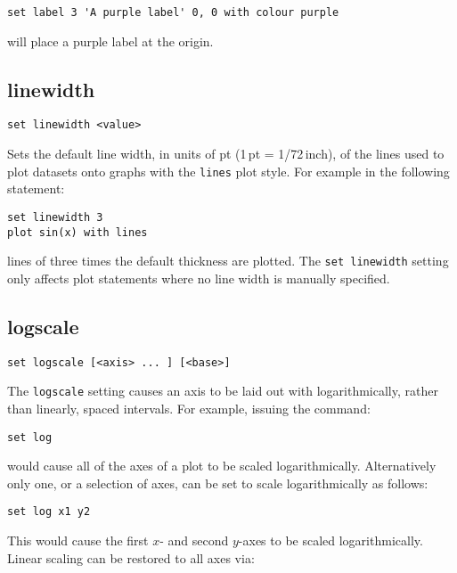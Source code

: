 \begin{verbatim}
set label 3 'A purple label' 0, 0 with colour purple
\end{verbatim}

\noindent will place a purple label at the origin.


\subsection{linewidth}

\begin{verbatim}
set linewidth <value>
\end{verbatim}

Sets the default line width, in units of pt (1\,pt = 1/72\,inch), of the lines
used to plot datasets onto graphs with the {\tt lines} plot style.  For
example in the following statement:

\begin{verbatim}
set linewidth 3
plot sin(x) with lines
\end{verbatim}

\noindent lines of three times the default thickness are plotted.  The
{\tt set linewidth} setting only affects plot statements where no line width is
manually specified.


\subsection{logscale}

\begin{verbatim}
set logscale [<axis> ... ] [<base>]
\end{verbatim}

The {\tt logscale} setting causes an axis to be laid out with logarithmically,
rather than linearly, spaced intervals.  For example, issuing the command:

\begin{verbatim}
set log
\end{verbatim}

\noindent would cause all of the axes of a plot to be scaled logarithmically. Alternatively
only one, or a selection of axes, can be set to scale logarithmically as
follows:

\begin{verbatim}
set log x1 y2
\end{verbatim}

This would cause the first $x$- and second $y$-axes to be scaled logarithmically.
Linear scaling can be restored to all axes via:

